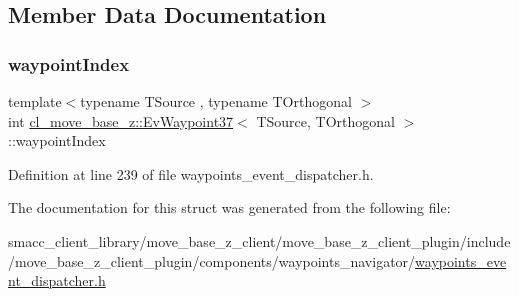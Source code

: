 \subsection{Member Data Documentation}
\mbox{\label{structcl__move__base__z_1_1EvWaypoint37_a1cf0795fae70f80eab53907cf0d5b4ce}} 
\subsubsection{\texorpdfstring{waypoint\+Index}{waypointIndex}}
{\footnotesize\ttfamily template$<$typename T\+Source , typename T\+Orthogonal $>$ \\
int \hyperlink{structcl__move__base__z_1_1EvWaypoint37}{cl\+\_\+move\+\_\+base\+\_\+z\+::\+Ev\+Waypoint37}$<$ T\+Source, T\+Orthogonal $>$\+::waypoint\+Index}



Definition at line 239 of file waypoints\+\_\+event\+\_\+dispatcher.\+h.



The documentation for this struct was generated from the following file\+:\begin{DoxyCompactItemize}
\item 
smacc\+\_\+client\+\_\+library/move\+\_\+base\+\_\+z\+\_\+client/move\+\_\+base\+\_\+z\+\_\+client\+\_\+plugin/include/move\+\_\+base\+\_\+z\+\_\+client\+\_\+plugin/components/waypoints\+\_\+navigator/\hyperlink{waypoints__event__dispatcher_8h}{waypoints\+\_\+event\+\_\+dispatcher.\+h}\end{DoxyCompactItemize}
